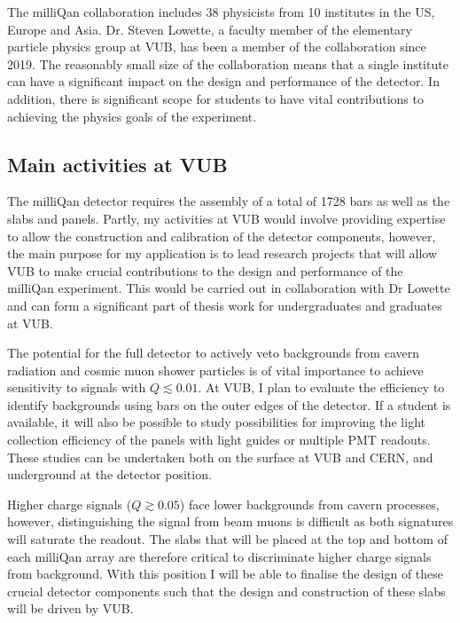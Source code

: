 \documentclass[11pt]{article}
\theoremstyle{plain} \numberwithin{equation}{section}
\theoremstyle{definition}
\begin{document}
The milliQan collaboration includes 38 physicists from 10 institutes in the US, 
Europe and Asia. Dr. Steven Lowette, a faculty member of the elementary particle 
physics group at VUB, has been a member of the collaboration since
2019. The reasonably small size of the collaboration means that a single institute
can have a significant impact on the design and performance of the detector. In addition,
there is significant scope for students to have vital contributions to 
achieving the physics goals of the experiment.  

\subsection*{Main activities at VUB}

The milliQan detector requires the assembly of a total of 1728 bars as well
as the slabs and panels. Partly, my activities at VUB would involve 
providing expertise to allow the construction and calibration of the detector components, 
however, the main purpose for my application is
to lead research projects that will allow VUB to make crucial contributions to
the design and performance of the milliQan experiment. 
This would be carried out in collaboration with Dr Lowette and
can form a significant part of thesis work for undergraduates and graduates at VUB.

The potential for the full detector to actively veto backgrounds from cavern radiation
and cosmic muon shower particles is of vital importance to 
achieve sensitivity to signals with $Q \lesssim 0.01$. At VUB, I plan to 
evaluate the efficiency to identify backgrounds using 
bars on the outer edges of the detector. If a student is available, it will also
be possible to study possibilities for improving the light collection efficiency of the panels 
with light guides or multiple PMT readouts. These studies can be undertaken 
both on the surface at VUB and CERN, and underground at the detector position.

Higher charge signals ($Q \gtrsim 0.05$) face lower backgrounds from cavern processes,
however, distinguishing the signal from beam muons is difficult as both 
signatures will saturate the readout. The slabs that will be placed at the top and bottom 
of each milliQan array are therefore critical to discriminate higher charge signals from background.
With this position I will be able to finalise the design of these crucial detector components such that the 
design and construction of these slabs will be driven by VUB.
\end{document}
